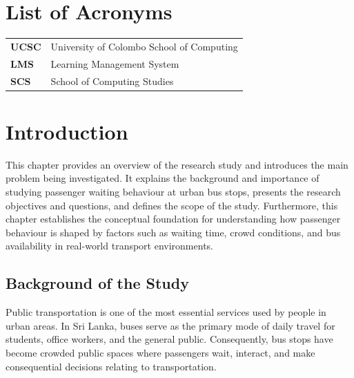 \documentclass[12pt, a4paper]{report}
\begin{document}
\chapter*{List of Acronyms}

\begin{tabular}{ll}
    \textbf{UCSC} & University of Colombo School of Computing \\
    \textbf{LMS}  & Learning Management System \\
    \textbf{SCS}  & School of Computing Studies \\
\end{tabular}

\setcounter{page}{1}
\setcounter{secnumdepth}{3}   %

\chapter{Introduction}

This chapter provides an overview of the research study and introduces the main problem
being investigated. It explains the background and importance of studying passenger waiting
behaviour at urban bus stops, presents the research objectives and questions, and defines
the scope of the study. Furthermore, this chapter establishes the conceptual foundation for
understanding how passenger behaviour is shaped by factors such as waiting time, crowd
conditions, and bus availability in real-world transport environments.

\section{Background of the Study}

Public transportation is one of the most essential services used by people in urban areas.
In Sri Lanka, buses serve as the primary mode of daily travel for students, office workers,
and the general public. Consequently, bus stops have become crowded public spaces where
passengers wait, interact, and make consequential decisions relating to transportation.
\end{document}
